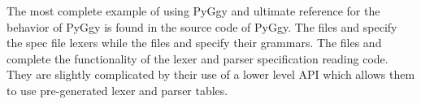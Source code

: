 The most complete
example of using PyGgy and ultimate reference for the behavior
of PyGgy is found in the source code of PyGgy.  The files
 and  specify the spec file lexers 
while the files  and  specify their
grammars.  The files  and  complete
the functionality of the lexer and parser specification reading
code.  They are slightly complicated by their use of a lower level
API which allows them to use pre-generated lexer and parser
tables.  

